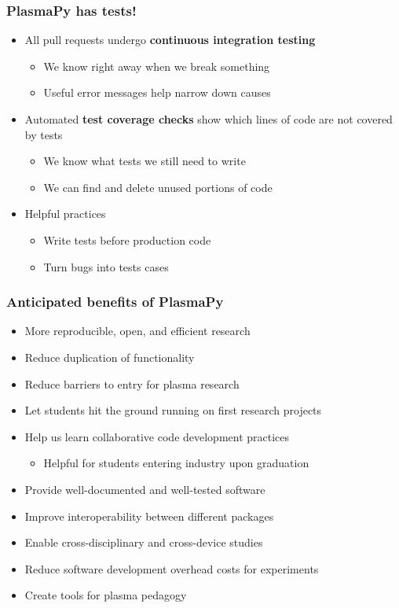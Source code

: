 \documentclass[default,compress]{beamer}
\begin{document}
\begin{frame}[plain]
    \frametitle{PlasmaPy has tests!}
    \begin{itemize}
    \item All pull requests undergo \textbf{continuous integration testing}
        \begin{itemize}
        \item We know right away when we break something
        \item Useful error messages help narrow down causes
        \end{itemize}
    \item Automated \textbf{test coverage checks} 
    show which lines of code are not covered by tests
        \begin{itemize}
        \item We know what tests we still need to write
        \item We can find and delete unused portions of code
        \end{itemize}
    \item Helpful practices
        \begin{itemize}
        \item Write tests before production code
        \item Turn bugs into tests cases
        \end{itemize}
    \end{itemize}
\end{frame}


\begin{frame}[plain]
    \frametitle{Anticipated benefits of PlasmaPy}
    \begin{itemize}
    \item More reproducible, open, and efficient research
    \item Reduce duplication of functionality
    \item Reduce barriers to entry for plasma research
    \item Let students hit the ground running on first research projects
    \item Help us learn collaborative code development practices
        \begin{itemize}
        \item Helpful for students entering industry upon graduation
        \end{itemize}
    \item Provide well-documented and well-tested software
    \item Improve interoperability between different packages
    \item Enable cross-disciplinary and cross-device studies
    \item Reduce software development overhead costs for experiments
    \item Create tools for plasma pedagogy
    \end{itemize}    
\end{frame}
\end{document}
